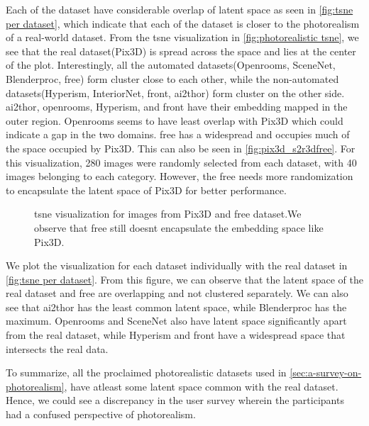 Each of the dataset have considerable overlap of latent space as seen in \autoref{fig:tsne per dataset}, which indicate that each of the dataset is closer to the photorealism of a real-world dataset.
From the \gls{tsne} visualization in \autoref{fig:photorealistic tsne}, we see that the real dataset(Pix3D) is spread across the space and lies at the center of the plot.
Interestingly, all the automated datasets(Openrooms, SceneNet, Blenderproc, \gls{free}) form cluster close to each other, while the non-automated datasets(Hyperism, InteriorNet, \gls{front}, \gls{ai2thor}) form cluster on the other side.
\gls{ai2thor}, openrooms, Hyperism, and \gls{front} have their embedding mapped in the outer region.
Openrooms seems to have least overlap with Pix3D which could indicate a gap in the two domains.
\gls{free} has a widespread and occupies much of the space occupied by Pix3D.
This can also be seen in \autoref{fig:pix3d_s2r3dfree}.
For this visualization, 280  images were randomly selected from each dataset, with 40 images belonging to each category.
However, the \gls{free} needs more randomization to encapsulate the latent space of Pix3D for better performance.

\begin{figure}[ht]
    \centering
    \resizebox{0.75\textwidth}{8.5cm}{}
    \caption{\gls{tsne} visualization for images from Pix3D and \gls{free} dataset.We observe that \gls{free} still doesnt encapsulate the embedding space like Pix3D.}
    \label{fig:pix3d_s2r3dfree}
\end{figure}


We plot the visualization for each dataset individually with the real dataset in \autoref{fig:tsne per dataset}.
From this figure, we can observe that the latent space of the real dataset and \gls{free} are overlapping and not clustered separately.
We can also see that \gls{ai2thor} has the least common latent space, while Blenderproc has the maximum.
Openrooms and SceneNet also have latent space significantly apart from the real dataset, while Hyperism and \gls{front} have a widespread space that intersects the real data.

To summarize, all the proclaimed photorealistic datasets used in \autoref{sec:a-survey-on-photorealism}, have atleast some latent space common with the real dataset.
Hence, we could see a discrepancy in the user survey wherein the participants had a confused perspective of photorealism.

